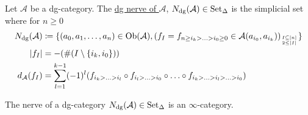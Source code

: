 \begin{defi}
	Let $ \mathcal{ A } $ be a dg-category. 
	The \underline{dg nerve of $ \mathcal{ A } $}, $ N_{ \operatorname{dg} } ( \mathcal{ A } ) \in \operatorname{Set}_{\Delta} $ is the simplicial set where for $ n \geq 0 $
	\begin{align*}
		N_{ \operatorname{dg} } ( \mathcal{ A } ) 
		&\coloneqq 
		\{ ( a_0 , a_1 , \dotsc , a_n ) \in \operatorname{Ob} ( \mathcal{ A } ) , ( f_I = f_{ n \geq i_k > \dotsc > i_0 \geq 0 } \in \mathcal{ A } ( a_{ i_0 } , a_{ i_k } ) )_{ I \subseteq [ n ] \atop 2 \leq \lvert I \rvert } \}
		\\
		\lvert f_I \rvert 
		&=
		- ( \# ( I \setminus \{ i_k , i_0 \} ) ) 
		\\
		d_{ \mathcal{ A } } ( f_I ) 
		&=
		\sum_{ l = 1 }^{ k - 1 } ( - 1 )^l ( f_{ i_k > \dotsc > i_l } \circ f_{ i_l > \dotsc > i_0 } \circ \dotsc \circ f_{ i_k > \dotsc > i_l > \dotsc > i_0 })
	\end{align*}
\end{defi}

\begin{thm}
	The nerve of a dg-category $ N_{ \operatorname{dg} } ( \mathcal{ A } ) \in \operatorname{Set}_{\Delta} $ is an $ \infty $-category.
\end{thm}

